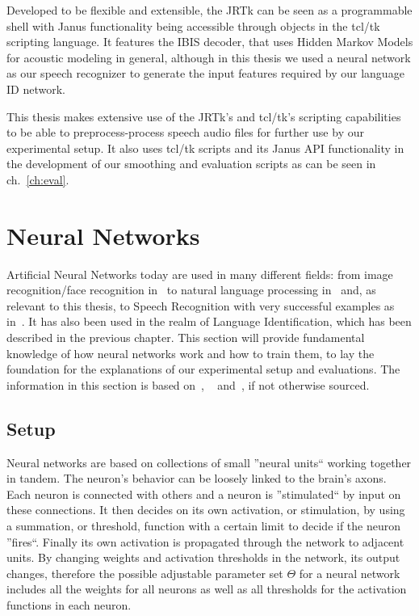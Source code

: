 Developed to be flexible and extensible, the JRTk can be seen as a programmable shell with Janus functionality being accessible through objects in the tcl/tk scripting language. It features the IBIS decoder, that uses Hidden Markov Models for acoustic modeling in general, although in this thesis we used a neural network as our speech recognizer to generate the input features required by our language ID network.

This thesis makes extensive use of the JRTk's and tcl/tk's scripting capabilities to be able to preprocess-process speech audio files for further use by our experimental setup. It also uses tcl/tk scripts and its Janus API functionality in the development of our smoothing and evaluation scripts as can be seen in ch.~\ref{ch:eval}.
\section{Neural Networks}
\label{sec:fund:NN}
Artificial Neural Networks today are used in many different fields: from image recognition/face recognition in~\cite{lawrence1997face} to natural language processing in~\cite{collobert2008unified} and, as relevant to this thesis, to Speech Recognition with very successful examples as in~\cite{hinton2012deep}. It has also been used in the realm of Language Identification, which has been described in the previous chapter. This section will provide fundamental knowledge of how neural networks work and how to train them, to lay the foundation for the explanations of our experimental setup and evaluations. The information in this section is based on~\cite{haykin2004comprehensive}, ~\cite{Goodfellow-et-al-2016} and~\cite{deeplearning-online}, if not otherwise sourced.


\subsection{Setup}
\label{sec:fund:general}
Neural networks are based on collections of small ''neural units``  working together in tandem. The neuron's behavior can be loosely linked to the brain's axons. Each neuron is connected with others and a neuron is ''stimulated`` by input on these connections. It then decides on its own activation, or stimulation, by using a summation, or threshold, function with a certain limit to decide if the neuron ''fires``. Finally its own activation is propagated through the network to adjacent units. By changing weights and activation thresholds in the network, its output changes, therefore the possible adjustable parameter set \(\Theta\) for a neural network includes all the weights for all neurons as well as all thresholds for the activation functions in each neuron.

